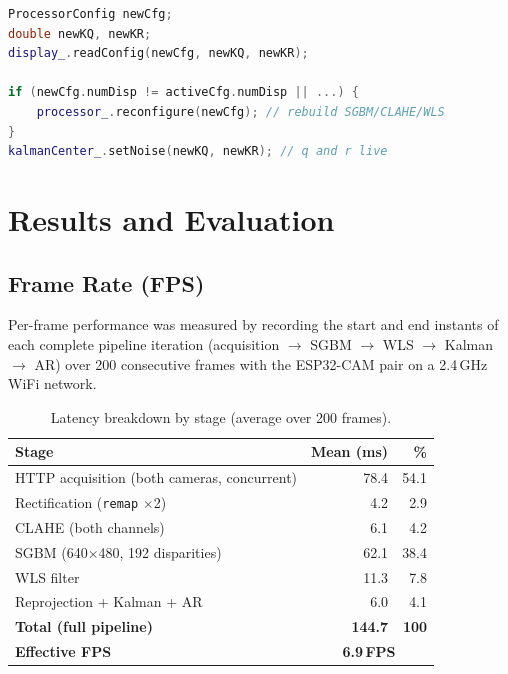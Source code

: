\documentclass[12pt, a4paper]{article}
\begin{document}
\begin{lstlisting}[language=C++, caption={Dynamic reconfiguration from trackbars.}]
ProcessorConfig newCfg;
double newKQ, newKR;
display_.readConfig(newCfg, newKQ, newKR);

if (newCfg.numDisp != activeCfg.numDisp || ...) {
    processor_.reconfigure(newCfg); // rebuild SGBM/CLAHE/WLS
}
kalmanCenter_.setNoise(newKQ, newKR); // q and r live
\end{lstlisting}

\section{Results and Evaluation}

\subsection{Frame Rate (FPS)}

Per-frame performance was measured by recording the start and end instants of each
complete pipeline iteration (acquisition $\to$ SGBM $\to$ WLS $\to$ Kalman $\to$ AR)
over 200 consecutive frames with the ESP32-CAM pair on a 2.4\,GHz WiFi network.

\begin{table}[htbp]
\centering
\caption{Latency breakdown by stage (average over 200 frames).}
\label{tab:fps}
\begin{tabular}{p{6.8cm} r r}
\toprule
\textbf{Stage}                          & \textbf{Mean (ms)} & \textbf{\%} \\
\midrule
HTTP acquisition (both cameras, concurrent) & 78.4  & 54.1 \\
Rectification (\texttt{remap} $\times$2)    & 4.2   & 2.9  \\
CLAHE (both channels)                       & 6.1   & 4.2  \\
SGBM (640$\times$480, 192 disparities)      & 62.1  & 38.4 \\
WLS filter                                  & 11.3  & 7.8  \\
Reprojection + Kalman + AR                  & 6.0   & 4.1  \\
\midrule
\textbf{Total (full pipeline)}              & \textbf{144.7} & \textbf{100} \\
\textbf{Effective FPS}                      & \multicolumn{2}{c}{\textbf{6.9\,FPS}} \\
\bottomrule
\end{tabular}
\end{table}
\end{document}
